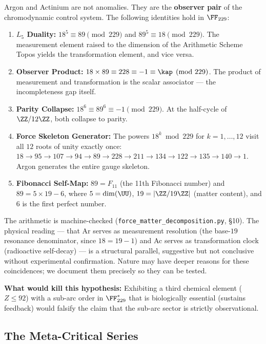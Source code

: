 \begin{hypothesis}\label{hyp:self-ref}
Argon and Actinium are not anomalies. They are the \textbf{observer pair} of the chromodynamic control system. The following identities hold in $\FF_{229}$:
\begin{enumerate}
\item \textbf{$L_5$ Duality:} $18^5 \equiv 89 \pmod{229}$ and $89^5 \equiv 18 \pmod{229}$. The measurement element raised to the dimension of the Arithmetic Scheme Topos yields the transformation element, and vice versa.
\item \textbf{Observer Product:} $18 \times 89 \equiv 228 \equiv -1 \equiv \kap \pmod{229}$. The product of measurement and transformation is the scalar associator --- the incompleteness gap itself.
\item \textbf{Parity Collapse:} $18^6 \equiv 89^6 \equiv -1 \pmod{229}$. At the half-cycle of $\ZZ/12\ZZ$, both collapse to parity.
\item \textbf{Force Skeleton Generator:} The powers $18^k \bmod 229$ for $k = 1, \ldots, 12$ visit all $12$ roots of unity exactly once: $18 \to 95 \to 107 \to 94 \to 89 \to 228 \to 211 \to 134 \to 122 \to 135 \to 140 \to 1$. Argon generates the entire gauge skeleton.
\item \textbf{Fibonacci Self-Map:} $89 = F_{11}$ (the 11th Fibonacci number) and $89 = 5 \times 19 - 6$, where $5 = \dim(\UU)$, $19 = |\ZZ/19\ZZ|$ (matter content), and $6$ is the first perfect number.
\end{enumerate}
The arithmetic is machine-checked (\texttt{force\_matter\_decomposition.py}, \S 10). The physical reading --- that Ar serves as measurement resolution (the base-$19$ resonance denominator, since $18 = 19 - 1$) and Ac serves as transformation clock (radioactive self-decay) --- is a structural parallel, suggestive but not conclusive without experimental confirmation. Nature may have deeper reasons for these coincidences; we document them precisely so they can be tested.
\end{hypothesis}

\noindent\textbf{What would kill this hypothesis:} Exhibiting a third chemical element ($Z \leq 92$) with a sub-arc order in $\FF_{229}^*$ that is biologically essential (sustains feedback) would falsify the claim that the sub-arc sector is strictly observational.


\subsection{The Meta-Critical Series}


